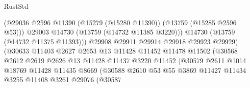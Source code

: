 \begin{lexlean}{RustStd}
\begin{coremodule}
                                          (@29036
                                            @2596
                                            @11390
                                            (@15279 (@15280 @11390))
                                            (@13759 (@15285 @2596 @53)))
                                          @29003
                                          @14730
                                          (@13759 (@14732 @11385 @3220)))
                                        @14730
                                        (@13759 (@14732 @11375 @11393)))
                                      @29908
                                      @29911
                                      @29914
                                      @29918
                                      @29923
                                      @29929)
                                    (@30633
                                      @11403
                                      @2627
                                      @2653
                                      @13
                                      @11428
                                      @11452
                                      @11478
                                      @11502
                                      (@30568
                                        @2612
                                        @2619
                                        @2626
                                        @13
                                        @11428
                                        @11437
                                        @3220
                                        @11452
                                        (@30579
                                          @2611
                                          @1014
                                          @18769
                                          @11428
                                          @11435
                                          @8669
                                          (@30588
                                            @2610
                                            @53
                                            @55
                                            @3869
                                            @11427
                                            @11434
                                            @3255
                                            @11408
                                            @3261
                                            @29076
                                            (@30587

\end{coremodule}
\end{lexlean}
